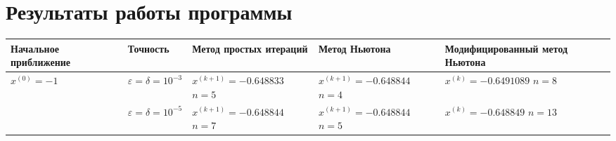 \section{Результаты работы программы}

\begin{table}[h!]
	\begin{tabular}{|p{12ex}|l|p{20ex}|p{20ex}|p{20ex}|}
		\hline
		Начальное приближение                     & Точность                            & Метод простых итераций & Метод Ньютона & Модифицированный метод Ньютона \\ \hline
		\(x^{(0)} = -1 \)                         &                                                                                                               %
		\(\varepsilon = \delta = 10^{-3} \)       &                                                                                                               %
		\(x^{(k+1)}=-0.648833\) \newline \(n=5\)  &                                                                                                               %
		\(x^{(k+1)}=-0.648844\) \newline \(n=4\)  &                                                                                                               %
		\(x^{(k)}=-0.6491089\) \newline \(n=8\)                                                                                                                   \\ \cline{2-5}
		                                          & \(\varepsilon = \delta = 10^{-5} \) &                                                                         %
		\(x^{(k+1)}=-0.648844\) \newline \(n=7\)  &                                                                                                               %
		\(x^{(k+1)}=-0.648844\) \newline \(n=5\)  &                                                                                                               %
		\(x^{(k)}=-0.648849\) \newline \(n=13\)                                                                                                                   \\ \hline


\end{tabular}
\end{table}
